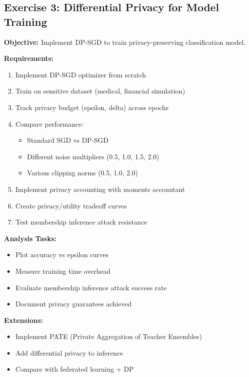 \subsection{Exercise 3: Differential Privacy for Model Training}

\textbf{Objective:} Implement DP-SGD to train privacy-preserving classification model.

\textbf{Requirements:}
\begin{enumerate}
    \item Implement DP-SGD optimizer from scratch
    \item Train on sensitive dataset (medical, financial simulation)
    \item Track privacy budget (epsilon, delta) across epochs
    \item Compare performance:
    \begin{itemize}
        \item Standard SGD vs DP-SGD
        \item Different noise multipliers (0.5, 1.0, 1.5, 2.0)
        \item Various clipping norms (0.5, 1.0, 2.0)
    \end{itemize}
    \item Implement privacy accounting with moments accountant
    \item Create privacy/utility tradeoff curves
    \item Test membership inference attack resistance
\end{enumerate}

\textbf{Analysis Tasks:}
\begin{itemize}
    \item Plot accuracy vs epsilon curves
    \item Measure training time overhead
    \item Evaluate membership inference attack success rate
    \item Document privacy guarantees achieved
\end{itemize}

\textbf{Extensions:}
\begin{itemize}
    \item Implement PATE (Private Aggregation of Teacher Ensembles)
    \item Add differential privacy to inference
    \item Compare with federated learning + DP
\end{itemize}


